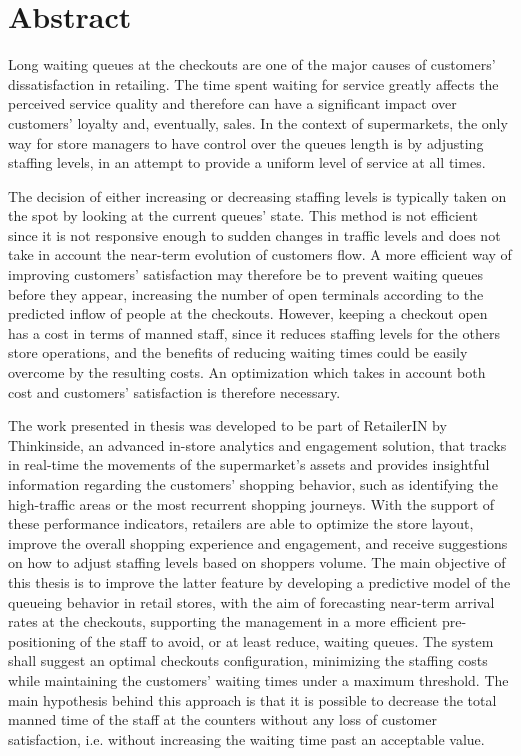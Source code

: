 \chapter*{Abstract}
\label{cha:abstract}


Long waiting queues at the checkouts are one of the major causes of customers’ dissatisfaction in retailing. The time spent waiting for service greatly affects the perceived service quality and therefore can have a significant impact over customers’ loyalty and, eventually, sales. In the context of supermarkets, the only way for store managers to have control over the queues length is by adjusting staffing levels, in an attempt to provide a uniform level of service at all times.

The decision of either increasing or decreasing staffing levels is typically taken on the spot by looking at the current queues’ state. This method is not efficient since it is not responsive enough to sudden changes in traffic levels  and does not take in account the near-term evolution of customers flow. A more efficient way of improving customers’ satisfaction may therefore be to prevent waiting queues before they appear, increasing the number of open terminals according to the predicted inflow of people at the checkouts. However, keeping a checkout open has a cost in terms of manned staff, since it reduces staffing levels for the others store operations, and the benefits of reducing waiting times could be easily overcome by the resulting costs. An optimization which takes in account both cost and customers’ satisfaction is therefore necessary.

The work presented in thesis was developed to be part of RetailerIN by Thinkinside, an advanced in-store analytics and engagement solution, that tracks in real-time the movements of the supermarket’s assets and provides insightful information regarding the customers’ shopping behavior, such as identifying the high-traffic areas or the most recurrent shopping journeys. With the support of these performance indicators, retailers are able to optimize the store layout, improve the overall shopping experience and engagement, and receive suggestions on how to adjust staffing levels based on shoppers volume. The main objective of this thesis is to improve the latter feature by developing a predictive model of the queueing behavior in retail stores, with the aim of forecasting near-term arrival rates at the checkouts, supporting the management in a more efficient pre-positioning of the staff to avoid, or at least reduce, waiting queues. The system shall suggest an optimal checkouts configuration, minimizing the staffing costs while maintaining the customers’ waiting times under a maximum threshold. The main hypothesis behind this approach is that it is possible to decrease the total manned time of the staff at the counters without any loss of customer satisfaction, i.e. without increasing the waiting time past an acceptable value.

